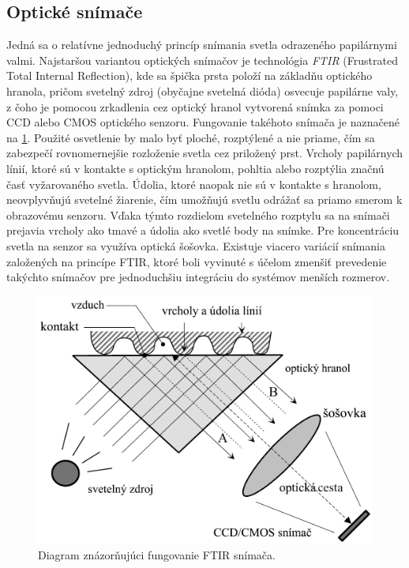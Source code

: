   \subsection{Optické snímače}
  Jedná sa o relatívne jednoduchý princíp snímania svetla odrazeného papilárnymi valmi. Najstaršou variantou optických snímačov je technológia \emph{FTIR}
  (Frustrated Total Internal Reflection), kde sa špička prsta položí na základňu optického hranola, pričom svetelný zdroj (obyčajne svetelná dióda) osvecuje
  papilárne valy, z čoho je pomocou zrkadlenia cez optický hranol vytvorená snímka za pomoci CCD alebo CMOS optického senzoru. Fungovanie takéhoto snímača
  je naznačené na \ref{obr:ftir_snimac}. Použité osvetlenie by malo byť ploché, rozptýlené a nie priame, čím sa zabezpečí rovnomernejšie rozloženie svetla
  cez priložený prst. Vrcholy papilárnych línií, ktoré sú v kontakte s optickým hranolom, pohltia alebo rozptýlia značnú časť vyžarovaného svetla. Údolia,
  ktoré naopak nie sú v kontakte s hranolom, neovplyvňujú svetelné žiarenie, čím umožňujú svetlu odrážať sa priamo smerom k obrazovému senzoru. Vďaka týmto
  rozdielom svetelného rozptylu sa na snímači prejavia vrcholy ako tmavé a údolia ako svetlé body na snímke. Pre koncentráciu svetla na senzor sa využíva
  optická šošovka. Existuje viacero variácií snímania založených na princípe FTIR, ktoré boli vyvinuté s účelom zmenšiť prevedenie takýchto snímačov
  pre jednoduchšiu integráciu do systémov menších rozmerov.

  \begin{figure}[h]
    \centering
    \includegraphics[width=0.6\linewidth]{obrazky-figures/ftir_snimac.png}
    \caption{Diagram znázorňujúci fungovanie FTIR snímača.}
    \label{obr:ftir_snimac}
  \end{figure}

